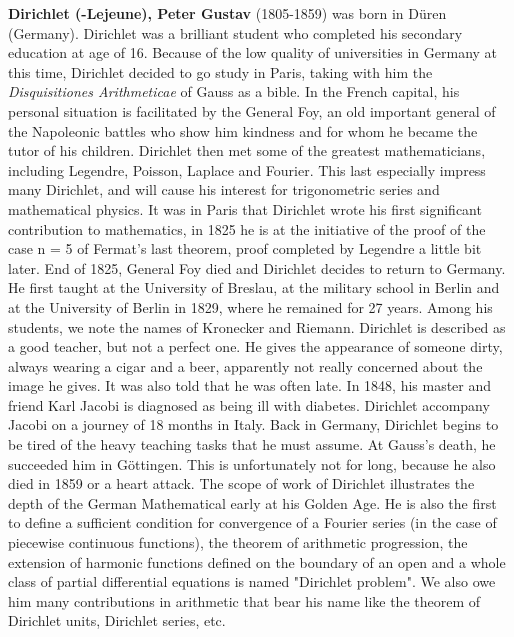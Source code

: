 \textbf{Dirichlet (-Lejeune), Peter Gustav} (1805-1859) was born in Düren (Germany). Dirichlet was a brilliant student who completed his secondary education at age of 16. Because of the low quality of universities in Germany at this time, Dirichlet decided to go study in Paris, taking with him the \textit{Disquisitiones Arithmeticae} of Gauss as a bible. In the French capital, his personal situation is facilitated by the General Foy, an old important general of the Napoleonic battles who show him kindness and for whom he became the tutor of his children. Dirichlet then met some of the greatest mathematicians, including Legendre, Poisson, Laplace and Fourier. This last especially impress many Dirichlet, and will cause his interest for trigonometric series and mathematical physics. It was in Paris that Dirichlet wrote his first significant contribution to mathematics, in 1825 he is at the initiative of the proof of the case n = 5 of Fermat's last theorem, proof completed by Legendre a little bit later. End of 1825, General Foy died and Dirichlet decides to return to Germany. He first taught at the University of Breslau, at the military school in Berlin and at the University of Berlin in 1829, where he remained for 27 years. Among his students, we note the names of Kronecker and Riemann. Dirichlet is described as a good teacher, but not a perfect one. He gives the appearance of someone dirty, always wearing a cigar and a beer, apparently not really concerned about the image he gives. It was also told that he was often late. In 1848, his master and friend Karl Jacobi is diagnosed as being ill with diabetes. Dirichlet accompany Jacobi on a journey of 18 months in Italy. Back in Germany, Dirichlet begins to be tired of the heavy teaching tasks that he must assume. At Gauss's death, he succeeded him in Göttingen. This is unfortunately not for long, because he also died in 1859 or a heart attack. The scope of work of Dirichlet illustrates the depth of the German Mathematical early at his Golden Age. He is also the first to define a sufficient condition for convergence of a Fourier series (in the case of piecewise continuous functions), the theorem of arithmetic progression, the extension of harmonic functions defined on the boundary of an open and a whole class of partial differential equations is named "Dirichlet problem". We also owe him many contributions in arithmetic that bear his name like the theorem of Dirichlet units, Dirichlet series, etc.

